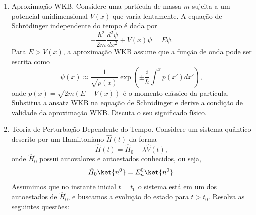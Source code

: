 \begin{enumerate}
\begin{enumerate}
                        $$
                              \hat{H} = \frac{\hat{p}^2}{2m} + \lambda \hat{x}^4
                        $$
                        e o estado de teste
                        $$
                              \braket{x|\psi_\alpha} = \exp\left(-\frac{\alpha x^2}{2}\right).
                        $$
                        Mostre que o valor esperado da energia é dado por
                        $$
                              E[\psi_\alpha] = \frac{\hbar^2\alpha}{4m} + \frac{3\lambda}{4\alpha^2}.
                        $$
                  \item Determine o valor de $\alpha$ que minimiza $E[\psi_\alpha]$ e mostre
                        que
                        $$
                              \alpha = \left(\frac{6m\lambda}{\hbar^2}\right)^{1/3}.
                        $$
                  \item Discuta a validade da aproximação e como ele pode ser melhorada e
                        testada.
            \end{enumerate}
      \item Aproximação WKB. Considere uma partícula de massa $m$ sujeita a um potencial
            unidimensional $V(x)$ que varia lentamente. A equação de Schrödinger
            independente do tempo é dada por
            $$
                  -\frac{\hbar^2}{2m} \frac{d^2\psi}{dx^2} + V(x) \psi = E \psi.
            $$
            Para $E > V(x)$, a aproximação WKB assume que a função de onda pode ser
            escrita como
            $$
                  \psi(x) \approx \frac{1}{\sqrt{p(x)}} \exp\left(\pm \frac{i}{\hbar} \int^x p(x') dx' \right),
            $$
            onde $p(x) = \sqrt{2m(E - V(x))}$ é o momento clássico da partícula.
            Substitua a ansatz WKB na equação de Schrödinger e derive a condição de
            validade da aproximação WKB. Discuta o seu significado físico.
      \item Teoria de Perturbação Dependente do Tempo. Considere um sistema quântico
            descrito por um Hamiltoniano $\hat{H}(t)$ da forma
            $$
                  \hat{H}(t) = \hat{H}_0 + \lambda \hat{V}(t),
            $$
            onde $\hat{H}_0$ possui autovalores e autoestados conhecidos, ou seja,
            $$
                  \hat{H}_0 \ket{n^0} = E_n^0 \ket{n^0}.
            $$
            Assumimos que no instante inicial $t = t_0$ o sistema está em um dos autoestados
            de $\hat{H}_0$, e buscamos a evolução do estado para $t > t_0$. Resolva as
            seguintes questões:

\end{enumerate}
